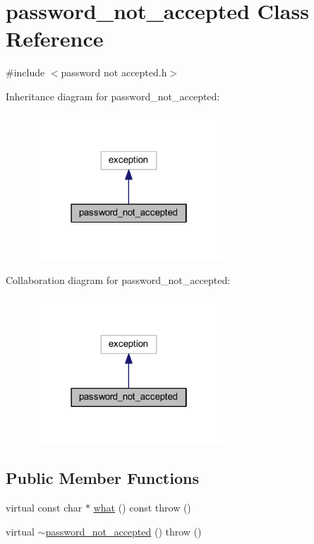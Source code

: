 \hypertarget{classpassword__not__accepted}{}\section{password\+\_\+not\+\_\+accepted Class Reference}
\label{classpassword__not__accepted}


{\ttfamily \#include $<$password not accepted.\+h$>$}



Inheritance diagram for password\+\_\+not\+\_\+accepted\+:\nopagebreak
\begin{figure}[H]
\begin{center}
\leavevmode
\includegraphics[width=202pt]{classpassword__not__accepted__inherit__graph}
\end{center}
\end{figure}


Collaboration diagram for password\+\_\+not\+\_\+accepted\+:\nopagebreak
\begin{figure}[H]
\begin{center}
\leavevmode
\includegraphics[width=202pt]{classpassword__not__accepted__coll__graph}
\end{center}
\end{figure}
\subsection*{Public Member Functions}
\begin{DoxyCompactItemize}
\item 
virtual const char $\ast$ \hyperlink{classpassword__not__accepted_a272c1e07f91db0e2661c272107dd4de8}{what} () const   throw ()
\item 
virtual \hyperlink{classpassword__not__accepted_a497f747f1453502ccee7076b669514c3}{$\sim$password\+\_\+not\+\_\+accepted} ()  throw ()
\end{DoxyCompactItemize}



